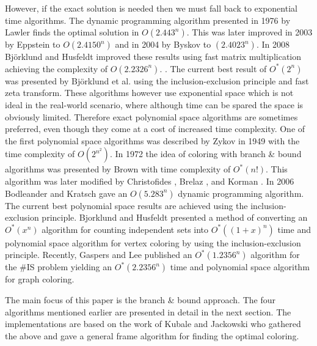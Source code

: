 However, if the exact solution is needed then we must fall back to exponential time algorithms. The dynamic programming algorithm presented in 1976 by
Lawler \cite{lawler1976note}
finds the optimal solution in $O(2.443^n)$. This was later improved in 2003 by 
Eppstein \cite{eppstein2002small}
to $O(2.4150^n)$
and in 2004 by
Byskov \cite{byskov2004enumerating} to $(2.4023^n)$.
In 2008
Bj\"orklund and Husfeldt \cite{bjorklund2008exact}
improved these results using fast matrix multiplication achieving the complexity of $O(2.2326^n)$.
. The current best result of $O^*(2^n)$  was presented by
Bj\"orklund et al. \cite{doi:10.1137/070683933}
using the inclusion-exclusion principle and fast zeta transform. These algorithms however use exponential space which is not ideal in the real-world scenario, where although time can be spared the space is obviously limited. Therefore exact polynomial space algorithms are sometimes preferred, even though they come at a cost of increased time complexity.
One of the first polynomial space algorithms was described by 
Zykov \cite{zykov1949some}
in 1949 with the time complexity of $O(2^{n^2})$. In 1972 the idea of coloring with branch \& bound algorithms was presented by 
Brown \cite{brown1972chromatic}
with time complexity of $O^*(n!)$. This algorithm was later modified by 
Christofides \cite{christofides1975graph},
Brelaz \cite{brlaz1979new},
and Korman \cite{korman1979graph}.
In 2006 Bodleander and Kratsch \cite{bodlaender2006exact} gave an $O(5.283^n)$ dynamic programming algorithm. The current best polynomial space results are achieved using the inclusion-exclusion principle. 
Bjorklund and Husfeldt \cite{Bjrklund2006InclusionExclusionBA}
presented a method of converting an $O^*(x^n)$ algorithm for counting independent sets into $O^*((1+x)^n)$ time and polynomial space algorithm for vertex coloring by using the inclusion-exclusion principle. Recently, Gaspers and Lee \cite{gaspers2023faster} published an $O^*(1.2356^n)$ algorithm for the \#IS problem yielding an $O^*(2.2356^n)$ time and polynomial space algorithm for graph coloring. 

The main focus of this paper is the branch \& bound approach. The four algorithms mentioned earlier are presented in detail in the next section.  The implementations are based on the work of Kubale and Jackowski \cite{10.1145/3341.3350} who gathered the above and gave a general frame algorithm for finding the optimal coloring.
